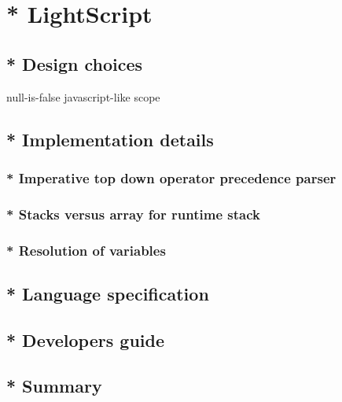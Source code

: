 \chapter{* LightScript}
\label{lightscript}
\section{* Design choices}
null-is-false
javascript-like scope
\section{* Implementation details}
\subsection{* Imperative top down operator precedence parser}
\subsection{* Stacks versus array for runtime stack}
\subsection{* Resolution of variables}
\section{* Language specification}
\section{* Developers guide}
\section{* Summary}
